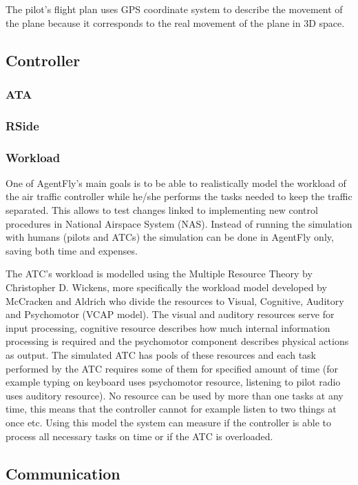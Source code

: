 The pilot's flight plan uses GPS coordinate system to describe the movement of the plane because it corresponds to the real movement of the plane in 3D space.

\subsection{Controller}
\subsubsection{ATA}
\subsubsection{RSide}

\subsubsection{Workload}

One of AgentFly's main goals is to be able to realistically model the workload of the air traffic controller while he/she performs the tasks needed to keep the traffic separated. This allows to test changes linked to implementing new control procedures in National Airspace System (NAS). Instead of running the simulation with humans (pilots and ATCs) the simulation can be done in AgentFly only, saving both time and expenses.

The ATC's workload is modelled using the Multiple Resource Theory by Christopher D. Wickens, more specifically the workload model developed by McCracken and Aldrich who divide the resources to Visual, Cognitive, Auditory and Psychomotor (VCAP model). \cite{agentfly-enroute} The visual and auditory resources serve for input processing, cognitive resource describes how much internal information processing is required and the psychomotor component describes physical actions as output. The simulated ATC has pools of these resources and each task performed by the ATC requires some of them for specified amount of time (for example typing on keyboard uses psychomotor resource, listening to pilot radio uses auditory resource). No resource can be used by more than one tasks at any time, this means that the controller cannot for example listen to two things at once etc. Using this model the system can measure if the controller is able to process all necessary tasks on time or if the ATC is overloaded.

\subsection{Communication}



